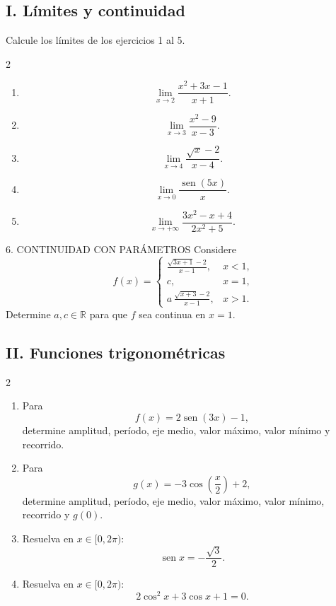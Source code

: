 \documentclass[letterpaper,12pt]{article}
\newcommand{\seno}{\operatorname{sen}}
\newcommand{\R}{\mathbb{R}}
\newcommand{\tituloSeccion}[1]{%
    \needspace{4\baselineskip}
    \subsection*{\color{azulFuerte}#1}
}
\begin{document}
\tituloSeccion{I. Límites y continuidad}
\noindent Calcule los límites de los ejercicios 1 al 5.

\begin{multicols}{2}
\begin{enumerate}[label=\color{azulFuerte}\textbf{\arabic*.},leftmargin=*,itemsep=1.1em]
    \item
    \[
        \lim_{x\to2}\frac{x^2+3x-1}{x+1}.
    \]

    \item
    \[
        \lim_{x\to3}\frac{x^2-9}{x-3}.
    \]

    \item
    \[
        \lim_{x\to4}\frac{\sqrt{x}-2}{x-4}.
    \]

    \item
    \[
        \lim_{x\to0}\frac{\seno(5x)}{x}.
    \]

    \item
    \[
        \lim_{x\to+\infty}
        \frac{3x^2-x+4}{2x^2+5}.
    \]
\end{enumerate}
\end{multicols}

\begin{ejerciciobox}{6. CONTINUIDAD CON PARÁMETROS}
Considere
\[
f(x)=
\begin{cases}
\displaystyle\frac{\sqrt{3x+1}-2}{x-1}, & x<1,\\[2mm]
c, & x=1,\\[2mm]
\displaystyle a\,\frac{\sqrt{x+3}-2}{x-1}, & x>1.
\end{cases}
\]
Determine \(a,c\in\R\) para que \(f\) sea continua en \(x=1\).
\end{ejerciciobox}

\tituloSeccion{II. Funciones trigonométricas}

\begin{multicols}{2}
\begin{enumerate}[label=\color{azulFuerte}\textbf{\arabic*.},leftmargin=*,start=7,itemsep=1em]
    \item Para
    \[
        f(x)=2\seno(3x)-1,
    \]
    determine amplitud, período, eje medio, valor máximo, valor mínimo y recorrido.

    \item Para
    \[
        g(x)=-3\cos\left(\frac{x}{2}\right)+2,
    \]
    determine amplitud, período, eje medio, valor máximo, valor mínimo, recorrido y \(g(0)\).

    \item Resuelva en \(x\in[0,2\pi)\):
    \[
        \seno x=-\frac{\sqrt3}{2}.
    \]

    \item Resuelva en \(x\in[0,2\pi)\):
    \[
        2\cos^2x+3\cos x+1=0.
    \]
\end{enumerate}
\end{multicols}
\end{document}
